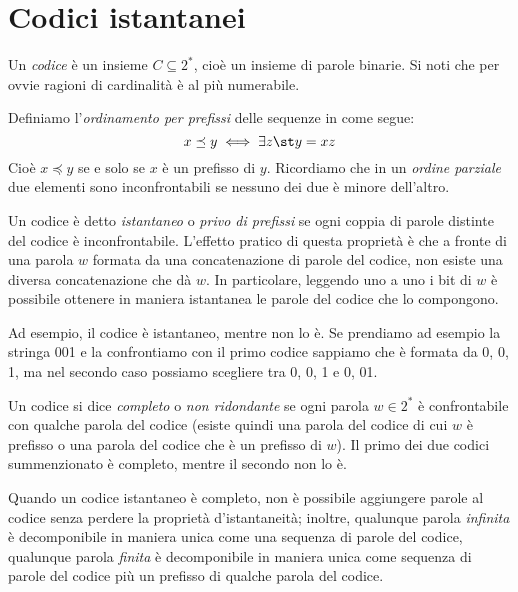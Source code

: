 \chapter{Codici istantanei}
Un \textit{codice} è un insieme $C \subseteq 2^*$, cioè un insieme di parole binarie. Si noti che per ovvie ragioni di cardinalità  è al più numerabile.

Definiamo l'\textit{ordinamento per prefissi} delle sequenze in  come segue:
\begin{equation}
    x \preceq y \iff \exists z \st y = xz
\end{equation}
Cioè $x \preceq y$ se e solo se $x$ è un prefisso di $y$. Ricordiamo che in un \textit{ordine parziale} due elementi sono inconfrontabili se nessuno dei due è minore dell'altro.

Un codice è detto \textit{istantaneo} o \textit{privo di prefissi} se ogni coppia di parole distinte del codice è inconfrontabile. L'effetto pratico di questa proprietà è che a fronte di una parola $w$ formata da una concatenazione di parole del codice, non esiste una diversa concatenazione che dà $w$. In particolare, leggendo uno a uno i bit di $w$ è possibile ottenere in maniera istantanea le parole del codice che lo compongono.

Ad esempio, il codice  è istantaneo, mentre  non lo è. Se prendiamo ad esempio la stringa 001 e la confrontiamo con il primo codice sappiamo che è formata da 0, 0, 1, ma nel secondo caso possiamo scegliere tra 0, 0, 1 e 0, 01.

Un codice si dice \textit{completo} o \textit{non ridondante} se ogni parola $w \in 2^*$ è confrontabile con qualche parola del codice (esiste quindi una parola del codice di cui $w$ è prefisso o una parola del codice che è un prefisso di $w$). Il primo dei due codici summenzionato è completo, mentre il secondo non lo è.

Quando un codice istantaneo è completo, non è possibile aggiungere parole al codice senza perdere la proprietà d'istantaneità; inoltre, qualunque parola \textit{infinita} è decomponibile in maniera unica come una sequenza di parole del codice, qualunque parola \textit{finita} è decomponibile in maniera unica come sequenza di parole del codice più un prefisso di qualche parola del codice.

